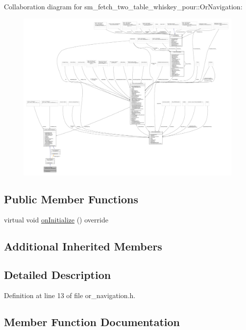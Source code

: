 Collaboration diagram for sm\+\_\+fetch\+\_\+two\+\_\+table\+\_\+whiskey\+\_\+pour\+:\+:Or\+Navigation\+:
\nopagebreak
\begin{figure}[H]
\begin{center}
\leavevmode
\includegraphics[width=350pt]{classsm__fetch__two__table__whiskey__pour_1_1OrNavigation__coll__graph}
\end{center}
\end{figure}
\subsection*{Public Member Functions}
\begin{DoxyCompactItemize}
\item 
virtual void \hyperlink{classsm__fetch__two__table__whiskey__pour_1_1OrNavigation_ab3310bc5913825e277c6f3f742192464}{on\+Initialize} () override
\end{DoxyCompactItemize}
\subsection*{Additional Inherited Members}


\subsection{Detailed Description}


Definition at line 13 of file or\+\_\+navigation.\+h.



\subsection{Member Function Documentation}
\mbox{\label{classsm__fetch__two__table__whiskey__pour_1_1OrNavigation_ab3310bc5913825e277c6f3f742192464}} 
